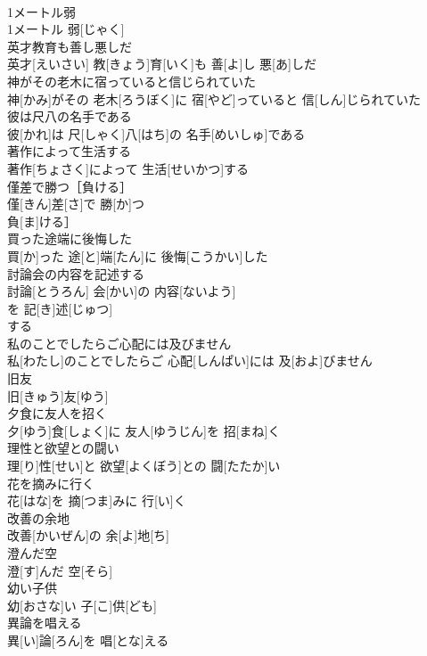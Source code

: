 \documentclass[8pt]{extreport}
\begin{document}
\begin{CJK}{UTF8}{min}
\\	1メートル弱	
\\	1メートル 弱[じゃく]
\\	英才教育も善し悪しだ	
\\	英才[えいさい] 教[きょう]育[いく]も 善[よ]し 悪[あ]しだ
\\	神がその老木に宿っていると信じられていた	
\\	神[かみ]がその 老木[ろうぼく]に 宿[やど]っていると 信[しん]じられていた
\\	彼は尺八の名手である	
\\	彼[かれ]は 尺[しゃく]八[はち]の 名手[めいしゅ]である
\\	著作によって生活する	
\\	著作[ちょさく]によって 生活[せいかつ]する
\\	僅差で勝つ［負ける］	
\\	僅[きん]差[さ]で 勝[か]つ
\\	負[ま]ける］
\\	買った途端に後悔した	
\\	買[か]った 途[と]端[たん]に 後悔[こうかい]した
\\	討論会の内容を記述する	
\\	討論[とうろん] 会[かい]の 内容[ないよう]
\\	を 記[き]述[じゅつ]
\\	する
\\	私のことでしたらご心配には及びません	
\\	私[わたし]のことでしたらご 心配[しんぱい]には 及[およ]びません
\\	旧友	
\\	旧[きゅう]友[ゆう]
\\	夕食に友人を招く	
\\	夕[ゆう]食[しょく]に 友人[ゆうじん]を 招[まね]く
\\	理性と欲望との闘い	
\\	理[り]性[せい]と 欲望[よくぼう]との 闘[たたか]い
\\	花を摘みに行く	
\\	花[はな]を 摘[つま]みに 行[い]く
\\	改善の余地	
\\	改善[かいぜん]の 余[よ]地[ち]
\\	澄んだ空	
\\	澄[す]んだ 空[そら]
\\	幼い子供	
\\	幼[おさな]い 子[こ]供[ども]
\\	異論を唱える	
\\	異[い]論[ろん]を 唱[とな]える

\end{CJK}
\end{document}
